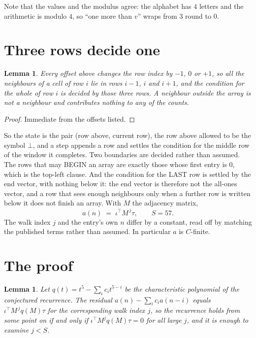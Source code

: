 \documentclass[11pt,a4paper]{article}
\theoremstyle{plain}
\newtheorem{lemma}[theorem]{Lemma}
\theoremstyle{definition}
\begin{document}
Note that the values and the modulus agree: the alphabet has $4$ letters and the arithmetic
is modulo $4$, so ``one more than $v$'' wraps from $3$ round to $0$.

\section{Three rows decide one}

\begin{lemma}\label{lem:win}
Every offset above changes the row index by $-1$, $0$ or $+1$, so all the neighbours of a cell
of row $i$ lie in rows $i-1$, $i$ and $i+1$, and the condition for the whole of row $i$ is
decided by those three rows. A neighbour outside the array is not a neighbour and contributes
nothing to any of the counts.
\end{lemma}

\begin{proof}
Immediate from the offsets listed.
\end{proof}

So the state is the pair (row above, current row), the row above allowed to be the symbol
$\bot$, and a step appends a row and settles the condition for the middle row of the window it
completes. Two boundaries are decided rather than assumed. The rows that may BEGIN an array are
exactly those whose first entry is $0$, which is the top-left clause. And the condition for the
LAST row is settled by the end vector, with nothing below it: the end vector is therefore not
the all-ones vector, and a row that sees enough neighbours only when a further row is written
below it does not finish an array. With $M$ the adjacency matrix,
\[
a(n)\;=\;\iota^{\!\top}M^{\,j}\tau ,\qquad S=57.
\]
The walk index $j$ and the entry's own $n$ differ by a constant, read off by matching the
published terms rather than assumed. In particular $a$ is $C$-finite.

\section{The proof}

\begin{lemma}\label{lem:crit}
Let $q(t)=t^{5}-\sum_i c_it^{5-i}$ be the characteristic polynomial of the
conjectured recurrence. The residual $a(n)-\sum_ic_ia(n-i)$ equals
$\iota^{\!\top}M^{\,j}q(M)\tau$ for the corresponding walk index $j$, so the recurrence
holds from some point on if and only if $\iota^{\!\top}M^{j}q(M)\tau=0$ for all large $j$,
and it is enough to examine $j<S$.
\end{lemma}
\end{document}
